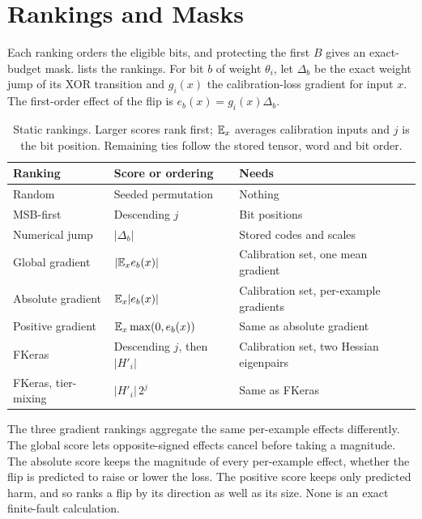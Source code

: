 \section{Rankings and Masks}\label{sec:susceptibility}\label{sec:estimators}
Each ranking orders the eligible bits, and protecting the first $B$ gives an exact-budget mask.  lists the rankings. For bit $b$ of weight $\theta_i$, let $\Delta_b$ be the exact weight jump of its XOR transition and $g_i(x)$ the calibration-loss gradient for input $x$. The first-order effect of the flip is $e_b(x)=g_i(x)\Delta_b$.

\begin{table}[t]
\caption{Static rankings. Larger scores rank first; $\mathbb{E}_x$ averages calibration inputs and $j$ is the bit position. Remaining ties follow the stored tensor, word and bit order.}\label{tab:methods}
\centering\small
\begin{tabularx}{\linewidth}{l l X}\toprule
Ranking & Score or ordering & Needs\\\midrule
Random & Seeded permutation & Nothing\\
MSB-first & Descending $j$ & Bit positions\\
Numerical jump & $|\Delta_b|$ & Stored codes and scales\\
Global gradient & $|\mathbb{E}_x e_b(x)|$ & Calibration set, one mean gradient\\
Absolute gradient & $\mathbb{E}_x|e_b(x)|$ & Calibration set, per-example gradients\\
Positive gradient & $\mathbb{E}_x\max(0,e_b(x))$ & Same as absolute gradient\\
FKeras & Descending $j$, then $|H'_i|$ & Calibration set, two Hessian eigenpairs\\
FKeras, tier-mixing & $|H'_i|\,2^{j}$ & Same as FKeras\\\bottomrule
\end{tabularx}
\end{table}

The three gradient rankings aggregate the same per-example effects differently. The global score lets opposite-signed effects cancel before taking a magnitude. The absolute score keeps the magnitude of every per-example effect, whether the flip is predicted to raise or lower the loss. The positive score keeps only predicted harm, and so ranks a flip by its direction as well as its size. None is an exact finite-fault calculation.

